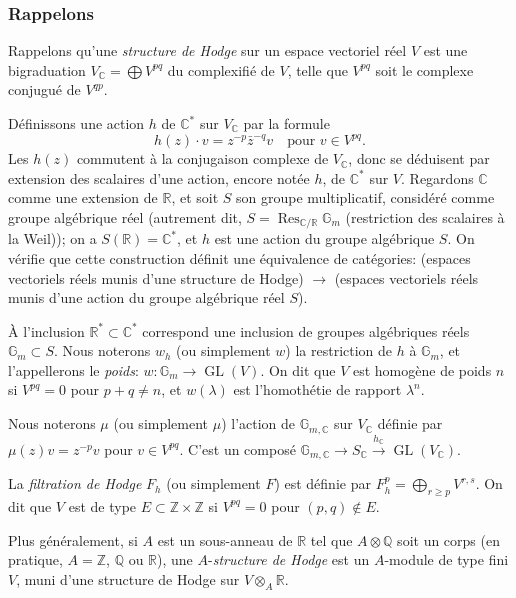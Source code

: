 \documentclass[12pt,a4paper]{article}
\theoremstyle{plain}
\theoremstyle{definition}
\theoremstyle{remark}
\DeclareMathOperator{\GL}{GL}
\DeclareMathOperator{\Res}{Res}
\newcommand{\ZZ}{\mathbb{Z}}
\newcommand{\QQ}{\mathbb{Q}}
\newcommand{\RR}{\mathbb{R}}
\newcommand{\CC}{\mathbb{C}}
\newcommand{\Gm}{\mathbb{G}}
\begin{document}
\subsubsection{Rappelons}

Rappelons qu'une \textit{structure de Hodge} sur un espace vectoriel r\'eel $V$ est une bigraduation $V_{\CC} = \bigoplus V^{pq}$ du complexifi\'e de $V$, telle que $V^{pq}$ soit le complexe conjugu\'e de $V^{qp}$.

D\'efinissons une action $h$ de $\CC^*$ sur $V_{\CC}$ par la formule
\begin{equation}\label{eq:1.1.1.1}
h(z)\cdot v = z^{-p}\bar{z}^{-q}v \quad \text{pour } v \in V^{pq}.
\end{equation}
Les $h(z)$ commutent \`a la conjugaison complexe de $V_{\CC}$, donc se d\'eduisent par extension des scalaires d'une action, encore not\'ee $h$, de $\CC^*$ sur $V$. Regardons $\CC$ comme une extension de $\RR$, et soit $S$ son groupe multiplicatif, consid\'er\'e comme groupe alg\'ebrique r\'eel (autrement dit, $S = \Res_{\CC/\RR}\Gm_m$ (restriction des scalaires \`a la Weil)); on a $S(\RR) = \CC^*$, et $h$ est une action du groupe alg\'ebrique $S$. On v\'erifie que cette construction d\'efinit une \'equivalence de cat\'egories: (espaces vectoriels r\'eels munis d'une structure de Hodge) $\to$ (espaces vectoriels r\'eels munis d'une action du groupe alg\'ebrique r\'eel $S$).

\`A l'inclusion $\RR^* \subset \CC^*$ correspond une inclusion de groupes alg\'ebriques r\'eels $\Gm_m \subset S$. Nous noterons $w_h$ (ou simplement $w$) la restriction de $h$ \`a $\Gm_m$, et l'appellerons le \textit{poids}: $w:\Gm_m \to \GL(V)$. On dit que $V$ est homog\`ene de poids $n$ si $V^{pq} = 0$ pour $p+q \neq n$, et $w(\lambda)$ est l'homoth\'etie de rapport $\lambda^n$.

Nous noterons $\mu$ (ou simplement $\mu$) l'action de $\Gm_{m,\CC}$ sur $V_{\CC}$ d\'efinie par $\mu(z)v = z^{-p}v$ pour $v \in V^{pq}$. C'est un compos\'e $\Gm_{m,\CC} \to S_{\CC} \xrightarrow{h_{\CC}} \GL(V_{\CC})$.

La \textit{filtration de Hodge} $F_h$ (ou simplement $F$) est d\'efinie par $F_h^p = \bigoplus_{r \ge p} V^{r,s}$. On dit que $V$ est de type $E \subset \ZZ \times \ZZ$ si $V^{pq} = 0$ pour $(p,q) \notin E$.

Plus g\'en\'eralement, si $A$ est un sous-anneau de $\RR$ tel que $A \otimes \QQ$ soit un corps (en pratique, $A = \ZZ$, $\QQ$ ou $\RR$), une $A$-\textit{structure de Hodge} est un $A$-module de type fini $V$, muni d'une structure de Hodge sur $V \otimes_A \RR$.
\end{document}
